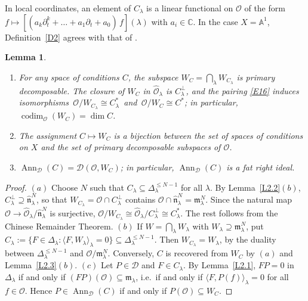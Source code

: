 \documentclass[11pt,reqno]{amsart}
\theoremstyle{plain}
\newtheorem{lemma}{Lemma}[section]
\theoremstyle{definition}
\theoremstyle{remark}
\numberwithin{equation}{section}
\newcommand{\cD}{\mathcal{D}}
\newcommand{\cO}{\mathcal{O}}
\newcommand{\C}{\mathbb{C}}
\newcommand{\A}{\mathbb{A}}
\newcommand{\del}{\partial}
\newcommand{\fn}{\mathfrak{n}}
\newcommand{\ml}{\mathfrak{m}_\lambda}
\newcommand{\hO}{\widehat{\cO}}
\newcommand{\hn}{\widehat{\fn}}
\newcommand{\Dl}{\Delta_\lambda}
\newcommand{\lan}{\langle}
\newcommand{\ran}{\rangle}
\DeclareMathOperator{\Ann}{Ann}
\DeclareMathOperator{\codim}{codim}
\begin{document}
In local coordinates, an element of $C_\lambda$ is a linear functional on $\cO$ of the form
$f \mapsto [(a_k \del_t^k + \ldots + a_1 \del_t + a_0)\, f](\lambda)$ with $a_i \in \C$. In the
case $X = \A^1$, Definition~\ref{D2} agrees with that of \cite[Section~4]{Wilson1993}.

\begin{lemma}
\label{L2.6}
\begin{enumerate}
\item[$(a)$] For any space of conditions $C$, the subspace $W_C = \bigcap_\lambda W_{C_\lambda}$ is
primary decomposable. The closure of $W_C$ in $\hO_\lambda$ is $C_\lambda^\perp$, and the pairing
\eqref{E16} induces isomorphisms $\,\cO/W_{C_\lambda} \cong C_\lambda^*\,$ and
$\,\cO/W_C \cong C^*$; in particular, $\codim_{\cO}(W_C) = \dim C$.
\item[$(b)$] The assignment $C \mapsto W_C$ is a bijection between the set of spaces of conditions on
$X$ and the set of primary decomposable subspaces of $\cO$.
\item[$(c)$] $\Ann_{\cD}(C) = \cD(\cO, W_C)$; in particular, $\Ann_{\cD}(C)$ is a fat right ideal.
\end{enumerate}
\end{lemma}

\begin{proof}
$(a)$ Choose $N$ such that $C_\lambda \subseteq \Dl^{\le N-1}$ for all $\lambda$. By
Lemma~\ref{L2.2}$(b)$, $C_\lambda^\perp \supseteq \hn_\lambda^N$, so that
$W_{C_\lambda} = \cO \cap C_\lambda^\perp$ contains $\cO \cap \hn^N_\lambda = \ml^N$. Since the
natural map $\cO \to \hO_\lambda/\hn_\lambda^N$ is surjective, $\cO/W_{C_\lambda} \cong
\hO_\lambda/C_\lambda^\perp \cong C_\lambda^*$. The rest follows from the Chinese Remainder Theorem.
$(b)$ If $W = \bigcap_\lambda W_\lambda$ with $W_\lambda \supseteq \ml^N$, put
$C_\lambda := \{ F \in \Dl : \lan F, W_\lambda\ran_\lambda = 0\} \subseteq \Dl^{\le N-1}$. Then
$W_{C_\lambda} = W_\lambda$, by the duality between $\Dl^{\le N-1}$ and $\cO/\ml^N$. Conversely,
$C$ is recovered from $W_C$ by $(a)$ and Lemma~\ref{L2.3}$(b)$. $(c)$ Let $P \in \cD$ and
$F \in C_\lambda$. By Lemma~\ref{L2.1}, $F P = 0$ in $\Dl$ if and only if $(FP)(\cO) \subseteq \ml$,
i.e.\ if and only if $\lan F, P(f) \ran_\lambda = 0$ for all $f \in \cO$. Hence
$P \in \Ann_{\cD}(C)$ if and only if $P(\cO) \subseteq W_C$.
\end{proof}
\end{document}
